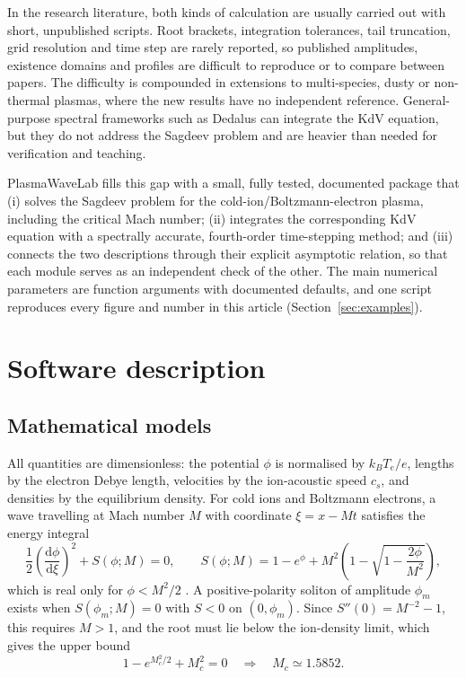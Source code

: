 \documentclass[preprint,12pt]{elsarticle}
\begin{document}
In the research literature, both kinds of calculation are usually carried out
with short, unpublished scripts. Root brackets, integration tolerances, tail
truncation, grid resolution and time step are rarely reported, so
published amplitudes, existence domains and profiles are difficult to reproduce
or to compare between papers. The difficulty is compounded in extensions to
multi-species, dusty or non-thermal plasmas, where the new results have no
independent reference. General-purpose spectral frameworks such as Dedalus
\cite{Burns2020} can integrate the KdV equation, but they do not address the
Sagdeev problem and are heavier than needed for verification and teaching.

PlasmaWaveLab fills this gap with a small, fully tested, documented package that
(i) solves the Sagdeev problem for the cold-ion/Boltzmann-electron plasma,
including the critical Mach number; (ii) integrates the corresponding KdV
equation with a spectrally accurate, fourth-order time-stepping method; and
(iii) connects the two descriptions through their explicit asymptotic relation,
so that each module serves as an independent check of the other. The main
numerical parameters are function arguments with documented defaults, and one
script reproduces every figure and number in this article
(Section~\ref{sec:examples}).

\section{Software description}
\label{sec:description}

\subsection{Mathematical models}
\label{sec:models}

All quantities are dimensionless: the potential $\phi$ is normalised by
$k_BT_e/e$, lengths by the electron Debye length, velocities by the
ion-acoustic speed $c_s$, and densities by the equilibrium density. For cold
ions and Boltzmann electrons, a wave travelling at Mach number $M$ with
coordinate $\xi=x-Mt$ satisfies the energy integral
\begin{equation}
\frac12\left(\frac{\mathrm d\phi}{\mathrm d\xi}\right)^2+S(\phi;M)=0,\qquad
S(\phi;M)=1-e^{\phi}+M^2\left(1-\sqrt{1-\frac{2\phi}{M^2}}\right),
\label{eq:sagdeev}
\end{equation}
which is real only for $\phi<M^2/2$ \cite{Sagdeev1966,Chen2016}. A
positive-polarity soliton of amplitude $\phi_m$ exists when $S(\phi_m;M)=0$
with $S<0$ on $(0,\phi_m)$. Since $S''(0)=M^{-2}-1$, this requires $M>1$, and the
root must lie below the ion-density limit, which gives the upper bound
\begin{equation}
1-e^{M_c^2/2}+M_c^2=0\quad\Longrightarrow\quad M_c\simeq1.5852 .
\label{eq:mc}
\end{equation}
\end{document}
